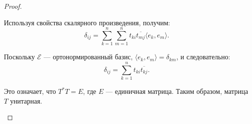 \begin{proof}
\begin{enumerate}
        \quad Используя свойства скалярного произведения, получим:
        \[
        \delta_{ij} = \sum_{k=1}^n \sum_{m=1}^n t_{ki} \overline{t_{mj}} \langle e_k, e_m \rangle.
        \]
        \nl
        
        \quad Поскольку \( \mathcal{E} \) — ортонормированный базис, \( \langle e_k, e_m \rangle = \delta_{km} \), и следовательно:
        \[
        \delta_{ij} = \sum_{k=1}^n t_{ki} \overline{t_{kj}}.
        \]
        \nl
        
        \quad Это означает, что \( T^* T = E \), где \( E \) — единичная матрица. Таким образом, матрица \( T \) унитарная.
    \end{enumerate}

\end{proof}